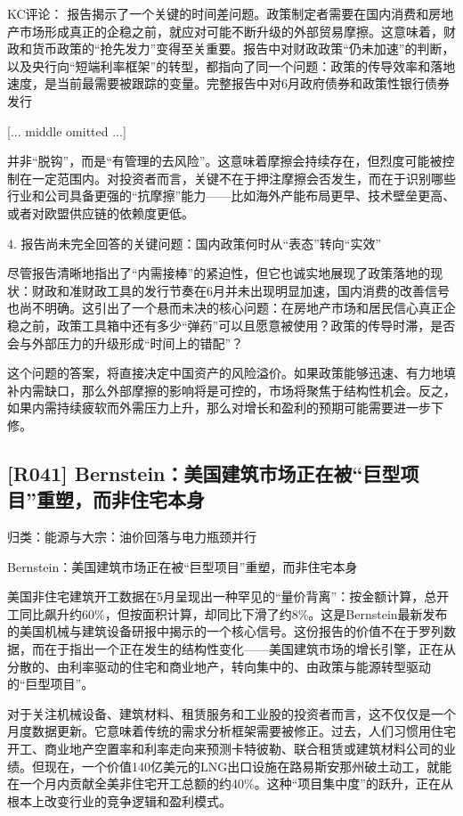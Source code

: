 \documentclass[11pt]{ctexart}
\begin{document}
KC评论： 报告揭示了一个关键的时间差问题。政策制定者需要在国内消费和房地产市场形成真正的企稳之前，就应对可能不断升级的外部贸易摩擦。这意味着，财政和货币政策的“抢先发力”变得至关重要。报告中对财政政策“仍未加速”的判断，以及央行向“短端利率框架”的转型，都指向了同一个问题：政策的传导效率和落地速度，是当前最需要被跟踪的变量。完整报告中对6月政府债券和政策性银行债券发行

[... middle omitted ...]

并非“脱钩”，而是“有管理的去风险”。这意味着摩擦会持续存在，但烈度可能被控制在一定范围内。对投资者而言，关键不在于押注摩擦会否发生，而在于识别哪些行业和公司具备更强的“抗摩擦”能力——比如海外产能布局更早、技术壁垒更高、或者对欧盟供应链的依赖度更低。

4. 报告尚未完全回答的关键问题：国内政策何时从“表态”转向“实效”

尽管报告清晰地指出了“内需接棒”的紧迫性，但它也诚实地展现了政策落地的现状：财政和准财政工具的发行节奏在6月并未出现明显加速，国内消费的改善信号也尚不明确。这引出了一个悬而未决的核心问题：在房地产市场和居民信心真正企稳之前，政策工具箱中还有多少“弹药”可以且愿意被使用？政策的传导时滞，是否会与外部压力的升级形成“时间上的错配”？

这个问题的答案，将直接决定中国资产的风险溢价。如果政策能够迅速、有力地填补内需缺口，那么外部摩擦的影响将是可控的，市场将聚焦于结构性机会。反之，如果内需持续疲软而外需压力上升，那么对增长和盈利的预期可能需要进一步下修。

\subsection{[R041] Bernstein：美国建筑市场正在被“巨型项目”重塑，而非住宅本身}
{\small\color{refgray}归类：能源与大宗：油价回落与电力瓶颈并行}

Bernstein：美国建筑市场正在被“巨型项目”重塑，而非住宅本身

美国非住宅建筑开工数据在5月呈现出一种罕见的“量价背离”：按金额计算，总开工同比飙升约60\%，但按面积计算，却同比下滑了约8\%。这是Bernstein最新发布的美国机械与建筑设备研报中揭示的一个核心信号。这份报告的价值不在于罗列数据，而在于指出一个正在发生的结构性变化——美国建筑市场的增长引擎，正在从分散的、由利率驱动的住宅和商业地产，转向集中的、由政策与能源转型驱动的“巨型项目”。

对于关注机械设备、建筑材料、租赁服务和工业股的投资者而言，这不仅仅是一个月度数据更新。它意味着传统的需求分析框架需要被修正。过去，人们习惯用住宅开工、商业地产空置率和利率走向来预测卡特彼勒、联合租赁或建筑材料公司的业绩。但现在，一个价值140亿美元的LNG出口设施在路易斯安那州破土动工，就能在一个月内贡献全美非住宅开工总额的约40\%。这种“项目集中度”的跃升，正在从根本上改变行业的竞争逻辑和盈利模式。
\end{document}
